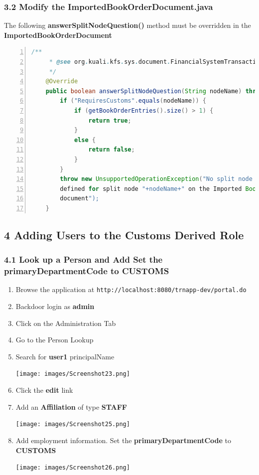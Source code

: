 \subsubsection*{3.2 Modify the ImportedBookOrderDocument.java}
The following \textbf{answerSplitNodeQuestion()} method must be overridden in the \textbf{ImportedBookOrderDocument}
\begin{lstlisting}[numbers=left,language=java,basicstyle=\scriptsize,backgroundcolor=\color{ubergray},caption={New
  KIM Type},frame=single,breaklines=true]
    /**
     * @see org.kuali.kfs.sys.document.FinancialSystemTransactionalDocumentBase#answerSplitNodeQuestion(java.lang.String)
     */
    @Override
    public boolean answerSplitNodeQuestion(String nodeName) throws UnsupportedOperationException {
        if ("RequiresCustoms".equals(nodeName)) {
            if (getBookOrderEntries().size() > 1) {
                return true;
            }
            else {
                return false;
            }
        }
        throw new UnsupportedOperationException("No split node logic
        defined for split node "+nodeName+" on the Imported Book Order
        document");
    }
\end{lstlisting}

\subsection*{4 Adding Users to the Customs Derived Role}
\subsubsection*{4.1 Look up a Person and Add Set the
  primaryDepartmentCode to CUSTOMS}
\begin{enumerate}
  \item Browse the application at
    \verb|http://localhost:8080/trnapp-dev/portal.do|
  \item Backdoor login as \textbf{admin}
  \item Click on the Administration Tab
  \item Go to the Person Lookup 
  \item Search for \textbf{user1} principalName

    \texttt{[image: images/Screenshot23.png]}
  \item Click the \textbf{edit} link
  \item Add an \textbf{Affiliation} of type \textbf{STAFF}

    \texttt{[image: images/Screenshot25.png]}
  \item Add employment information. Set the
    \textbf{primaryDepartmentCode} to \textbf{CUSTOMS}

    \texttt{[image: images/Screenshot26.png]}
\end{enumerate}


